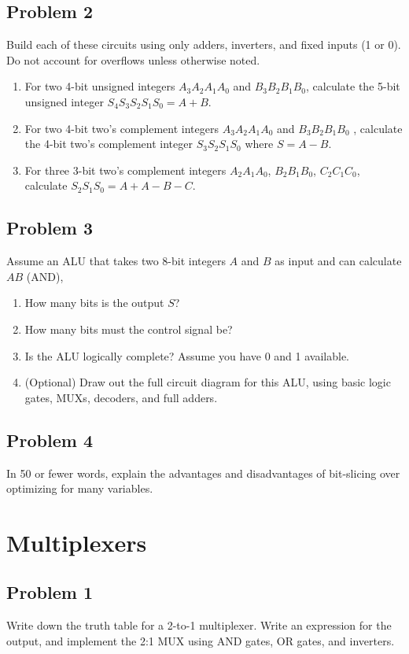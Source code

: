 \documentclass{article}
\begin{document}
\subsection*{Problem 2}
Build each of these circuits using only adders, inverters, and fixed inputs (1 or 0). Do not account for overflows unless otherwise noted.
\begin{enumerate}[label=\alph*.]
    \item For two 4-bit unsigned integers $A_3A_2A_1A_0$ and $B_3B_2B_1B_0$, calculate the 5-bit unsigned integer $S_4S_3S_2S_1S_0 = A + B$. 
    \item For two 4-bit two's complement integers $A_3A_2A_1A_0$ and $B_3B_2B_1B_0$ , calculate the 4-bit two's complement integer $S_3S_2S_1S_0$ where $S=A-B$.
    \item For three 3-bit two's complement integers $A_2A_1A_0$, $B_2B_1B_0$, $C_2C_1C_0$, calculate $S_2S_1S_0=A+A-B-C$.
\end{enumerate}


\subsection*{Problem 3}
Assume an ALU that takes two 8-bit integers $A$ and $B$ as input and can calculate $AB$ (AND), 
\begin{enumerate}[label=\alph*.]
    \item How many bits is the output $S$?
    \item How many bits must the control signal be? 
    \item Is the ALU logically complete? Assume you have 0 and 1 available.
    \item (Optional) Draw out the full circuit diagram for this ALU, using basic logic gates, MUXs, decoders, and full adders.
\end{enumerate}


\subsection*{Problem 4}
In 50 or fewer words, explain the advantages and disadvantages of bit-slicing over optimizing for many variables.

\newpage
\section*{Multiplexers}
\subsection*{Problem 1}
Write down the truth table for a 2-to-1 multiplexer. Write an expression for the output, and implement the 2:1 MUX using AND gates, OR gates, and inverters.
\end{document}
